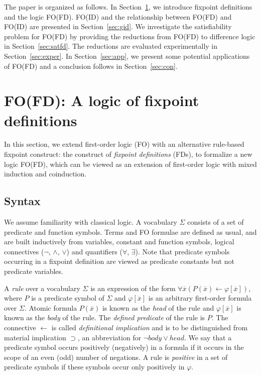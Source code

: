 \documentclass{tlp}
\newcommand{\rul}{\leftarrow}
\newcommand{\xxx}{\overline{x}}
\newcommand{\Voc}{\ensuremath{\Sigma}\xspace}
\begin{document}
The paper is organized as follows. In Section~\ref{sec:fd}, we introduce fixpoint definitions and the logic FO(FD). FO(ID) and the relationship between FO(FD) and FO(ID) are presented in Section~\ref{sec:gid}. We investigate the satisfiability problem for FO(FD) by providing the reductions from FO(FD) to difference logic in Section~\ref{sec:satfd}. The reductions are evaluated experimentally in Section~\ref{sec:exper}. In Section~\ref{sec:app}, we present some potential applications of FO(FD) and a conclusion follows in Section~\ref{sec:con}.
\section{FO(FD): A logic of fixpoint definitions}\label{sec:fd}


In this section, we extend first-order logic (FO) with an alternative rule-based fixpoint construct: the construct of {\em fixpoint definitions} (FDs), to formalize a new logic FO(FD), which can be viewed as an extension of first-order logic with mixed induction and coinduction.

\subsection{Syntax}


We assume familiarity with classical logic. A vocabulary $\Voc$ consists of a set of predicate and function symbols.
Terms and FO formulae are defined as usual, and are built inductively from variables, constant and function symbols, logical connectives ($\neg$, $\land$, $\lor$) and quantifiers ($\forall$, $\exists$). Note that predicate symbols occurring in a fixpoint definition are viewed as predicate constants but not predicate variables.

A {\em rule} over a vocabulary $\Sigma$ is an expression of the form $\forall \xxx ( P(\xxx) \rul \varphi[\xxx])$, where $P$ is a predicate symbol of $\Sigma$ and $\varphi[\xxx]$ is an arbitrary first-order formula over $\Sigma$. Atomic formula $P(\xxx)$ is known as the {\em head} of the rule and $\varphi[\xxx]$ is known as the {\em body} of the rule. The {\em defined predicate} of the rule is $P$. The connective $\rul$ is called {\em definitional implication} and is to be distinguished from material implication $\supset$, an abbreviation for $\lnot body \lor head$. We say that a predicate symbol occurs positively (negatively) in a formula if it occurs in the scope of an even (odd) number of negations. A rule is {\em positive} in a set of predicate symbols if these symbols occur only positively in $\varphi$.
\end{document}
